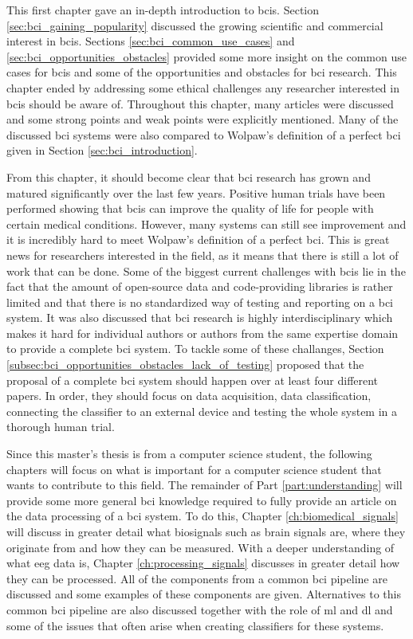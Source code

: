 This first chapter gave an in-depth introduction to \glspl{bci}.
Section \ref{sec:bci_gaining_popularity} discussed the growing scientific and commercial interest in \glspl{bci}.
Sections \ref{sec:bci_common_use_cases} and \ref{sec:bci_opportunities_obstacles} provided some more insight on the common use cases for \glspl{bci} and some of the opportunities and obstacles for \gls{bci} research.
This chapter ended by addressing some ethical challenges any researcher interested in \glspl{bci} should be aware of.
Throughout this chapter, many articles were discussed and some strong points and weak points were explicitly mentioned.
Many of the discussed \gls{bci} systems were also compared to Wolpaw's definition of a perfect \gls{bci} given in Section \ref{sec:bci_introduction}.

From this chapter, it should become clear that \gls{bci} research has grown and matured significantly over the last few years.
Positive human trials have been performed showing that \glspl{bci} can improve the quality of life for people with certain medical conditions.
However, many systems can still see improvement and it is incredibly hard to meet Wolpaw's definition of a perfect \gls{bci}.
This is great news for researchers interested in the field, as it means that there is still a lot of work that can be done.
Some of the biggest current challenges with \glspl{bci} lie in the fact that the amount of open-source data and code-providing libraries is rather limited and that there is no standardized way of testing and reporting on a \gls{bci} system.
It was also discussed that \gls{bci} research is highly interdisciplinary which makes it hard for individual authors or authors from the same expertise domain to provide a complete \gls{bci} system.
To tackle some of these challanges, Section \ref{subsec:bci_opportunities_obstacles_lack_of_testing} proposed that the proposal of a complete \gls{bci} system should happen over at least four different papers.
In order, they should focus on data acquisition, data classification, connecting the classifier to an external device and testing the whole system in a thorough human trial.

Since this master's thesis is from a computer science student, the following chapters will focus on what is important for a computer science student that wants to contribute to this field.
The remainder of Part \ref{part:understanding} will provide some more general \gls{bci} knowledge required to fully provide an article on the data processing of a \gls{bci} system.
To do this, Chapter \ref{ch:biomedical_signals} will discuss in greater detail what \glspl{biosignal} such as brain signals are, where they originate from and how they can be measured.
With a deeper understanding of what \gls{eeg} data is, Chapter \ref{ch:processing_signals} discusses in greater detail how they can be processed.
All of the components from a common \gls{bci} pipeline are discussed and some examples of these components are given.
Alternatives to this common \gls{bci} pipeline are also discussed together with the role of \gls{ml} and \gls{dl} and some of the issues that often arise when creating classifiers for these systems.

